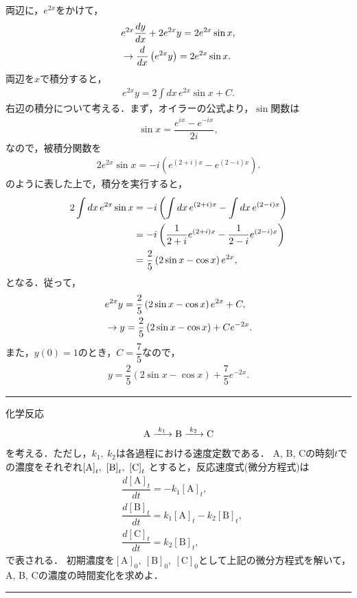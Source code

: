 \setcounter{section}{2}
\setcounter{equation}{0}
\noindent
両辺に，$e^{2x}$をかけて，
\begin{align}
 & e^{2x}\dfrac{dy}{dx} + 2e^{2x}y = 2e^{2x}\sin x, \notag \\
 & \rightarrow \dfrac{d}{dx}\left(e^{2x}y\right) = 2e^{2x}\sin x. 
\end{align}
両辺を$x$で積分すると，
\begin{align}
 e^{2x} y = 2\int dx \, e^{2x}\sin x + C. 
\end{align}
右辺の積分について考える．まず，オイラーの公式より，$\sin$関数は
\begin{align}
  \sin x = \dfrac{e^{ix} - e^{-ix}}{2i}, 
\end{align}
なので，被積分関数を
\begin{align}
 2e^{2x}\sin x = -i\left(e^{(2+i)x} - e^{(2-i)x}\right). 
\end{align}
のように表した上で，積分を実行すると，
\begin{align}
 2\int dx\,e^{2x}\sin x 
 & = -i \left(\int dx\, e^{(2+i)x} - \int dx\, e^{(2-i)x}\right) \notag \\
 & = -i \left(\dfrac{1}{2+i}e^{(2+i)x} - \dfrac{1}{2-i}e^{(2-i)x}\right) \notag \\
 & = \dfrac{2}{5}\left(2\sin x - \cos x\right)e^{2x},
\end{align}
となる．従って，
\begin{align}
  &e^{2x}y = \dfrac{2}{5}\left(2\sin x - \cos x\right)e^{2x} + C, \notag \\
  &\rightarrow y = \dfrac{2}{5}\left(2\sin x -\cos x\right) + Ce^{-2x}.
\end{align}
また，$y(0)=1$のとき，$C=\dfrac{7}{5}$なので，
\begin{align}
  y = \dfrac{2}{5}\left(2\sin x - \cos x\right)  + \dfrac{7}{5}e^{-2x}.
\end{align}

\newpage
\hrule
\vspace*{.2cm}
\enshu
化学反応
\begin{align*}
 \ce{A ->[k_1] B ->[k_2] C}  
\end{align*}
を考える．ただし，$k_1,~k_2$は各過程における速度定数である．
A, B, Cの時刻$t$での濃度をそれぞれ$\ce{[A]}_t,~\ce{[B]}_t,~\ce{[C]}_t$
とすると，反応速度式(微分方程式)は
\begin{align*}
  &\dfrac{d[\mathrm{A}]_t}{dt} = -k_1 [\mathrm{A}]_t, \\
  &\dfrac{d[\mathrm{B}]_t}{dt} =  k_1 [\mathrm{A}]_t - k_2 [\mathrm{B}]_t, \\
  &\dfrac{d[\mathrm{C}]_t}{dt} =  k_2 [\mathrm{B}]_t, 
\end{align*}
で表される．
初期濃度を$[\mathrm{A}]_0,~[\mathrm{B}]_0,~[\mathrm{C}]_0$として上記の微分方程式を解いて，
A, B, Cの濃度の時間変化を求めよ．
\vspace*{.2cm}
\hrule
\vspace*{.2cm}

